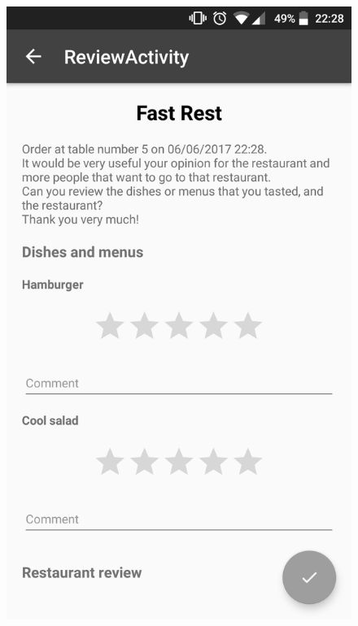 \begin{figure}[!h]
\centering
\includegraphics[scale=0.15]{Figures/wisebite_screenshot_7.png}

\end{figure}
